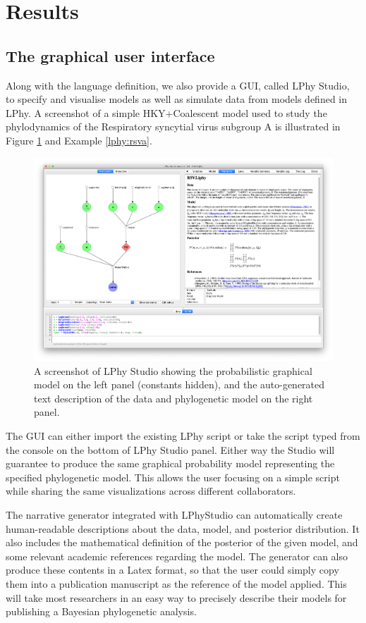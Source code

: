 \documentclass[10pt,letterpaper,table]{article}
\begin{document}
{\section{Results}

\subsection{The graphical user interface}
Along with the language definition, we also provide a GUI, called LPhy Studio, to specify and visualise models as well as simulate data from models defined in LPhy. A screenshot of a simple HKY+Coalescent model used to study the phylodynamics of the Respiratory syncytial virus subgroup A \cite{zlateva2004molecular} is illustrated in Figure \ref{fig:lphystudio} and Example \ref{lphy:rsva}.

\begin{figure}
  \includegraphics[width=\textwidth]{figs/lphystudio_screenshot.png}
  \caption{A screenshot of LPhy Studio showing the probabilistic graphical model 
  on the left panel (constants hidden), and the auto-generated text description of the data and phylogenetic model on the right panel.} 
  \label{fig:lphystudio}
\end{figure}

The GUI can either import the existing LPhy script or take the script typed from the console on the bottom of LPhy Studio panel. Either way the Studio will guarantee to produce the same graphical probability model representing the specified phylogenetic model. 
This allows the user focusing on a simple script while sharing the same visualizations across different collaborators.  

The narrative generator integrated with LPhyStudio can automatically create human-readable descriptions about the data, model, and posterior distribution. 
It also includes the mathematical definition of the posterior of the given model, and some relevant academic references regarding the model. 
The generator can also produce these contents in a Latex format, so that the user could simply copy them into a publication manuscript as the reference of the model applied. 
This will take most researchers in an easy way to precisely describe their models for publishing a Bayesian phylogenetic analysis. 


}
\end{document}
